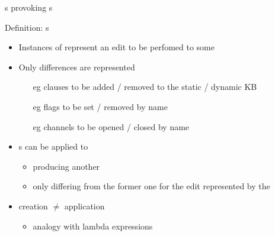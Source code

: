 \documentclass[handout]{beamer}
\begin{document}
\begin{frame}[allowframebreaks]{s provoking s}
    \begin{block}{Definition: s}
        \begin{itemize}
            \item Instances of  represent an \alert{edit to be perfomed} to some 
            \item Only \alert{differences} are represented
            \begin{itemize}
                \item[eg] \alert{clauses} to be \alert{added} / \alert{removed} to the static / dynamic KB
                \item[eg] \alert{flags} to be \alert{set} / \alert{removed} by \alert{name}
                \item[eg] \alert{channels} to be \alert{opened} / \alert{closed} by \alert{name}
            \end{itemize}
            \item {}s can be \alert{applied} to 
            \begin{itemize}
                \item producing \alert{another} 
                \item only differing from the former one for the \alert{edit} represented by the 
            \end{itemize}
            \item {} creation \alert{$\neq$}  application
            \begin{itemize}
                \item analogy with lambda expressions
            \end{itemize}
        \end{itemize}
    \end{block}


\end{frame}
\end{document}

